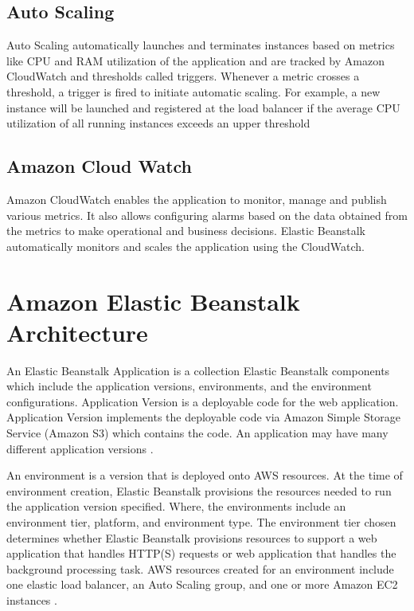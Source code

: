 \documentclass[9pt,twocolumn,twoside]{../../styles/osajnl}
\begin{document}
\subsection{Auto Scaling}

Auto Scaling automatically launches and terminates instances based on
metrics like CPU and RAM utilization of the application and are
tracked by Amazon CloudWatch and thresholds called triggers. Whenever
a metric crosses a threshold, a trigger is fired to initiate automatic
scaling.  For example, a new instance will be launched and registered
at the load balancer if the average CPU utilization of all running
instances exceeds an upper threshold
    
\subsection{Amazon Cloud Watch}

Amazon CloudWatch enables the application to monitor, manage and
publish various metrics. It also allows configuring alarms based on
the data obtained from the metrics to make operational and business
decisions. Elastic Beanstalk automatically monitors and scales the
application using the CloudWatch.

\section{Amazon Elastic Beanstalk Architecture}

An Elastic Beanstalk Application is a collection Elastic Beanstalk
components which include the application versions, environments, and
the environment configurations. Application Version is a
deployable code for the web application. Application Version
implements the deployable code via Amazon Simple Storage Service
(Amazon S3) which contains the code. An application may have many
different application versions \cite{elastic-component}.


An environment is a version that is deployed onto AWS resources.  At
the time of environment creation, Elastic Beanstalk provisions the
resources needed to run the application version specified. Where, the
environments include an environment tier, platform, and environment
type. The environment tier chosen determines whether Elastic Beanstalk
provisions resources to support a web application that handles HTTP(S)
requests or web application that handles the background processing
task. AWS resources created for an environment include one elastic
load balancer, an Auto Scaling group, and one or more Amazon EC2
instances \cite{elastic-architecture}.
\end{document}
